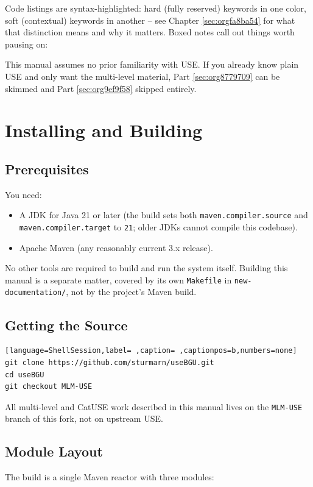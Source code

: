 \documentclass[11pt,twoside,a4paper]{book}
\begin{document}
Code listings are syntax-highlighted: hard (fully reserved) keywords
in one color, soft (contextual) keywords in another -- see Chapter
\ref{sec:orgfa8ba54} for what that distinction means and why it
matters. Boxed notes call out things worth pausing on:

\begin{manualnote}
This manual assumes no prior familiarity with USE. If you already know
plain USE and only want the multi-level material, Part
\ref{sec:org8779709} can be skimmed and Part \ref{sec:org9ef9f58}
skipped entirely.
\end{manualnote}
\chapter{Installing and Building}
\label{sec:org73dfb48}
\section{Prerequisites}
\label{sec:orgdc154d7}

You need:

\begin{itemize}
\item A JDK for Java 21 or later (the build sets both
\texttt{maven.compiler.source} and \texttt{maven.compiler.target} to \texttt{21}; older
JDKs cannot compile this codebase).
\item Apache Maven (any reasonably current 3.x release).
\end{itemize}

No other tools are required to build and run the system itself.
Building this manual is a separate matter, covered by its own
\texttt{Makefile} in \texttt{new-documentation/}, not by the project's Maven build.

\section{Getting the Source}
\label{sec:org0fb9f19}
\begin{lstlisting}[language=ShellSession,label= ,caption= ,captionpos=b,numbers=none]
git clone https://github.com/sturmarn/useBGU.git
cd useBGU
git checkout MLM-USE
\end{lstlisting}

All multi-level and CatUSE work described in this manual lives on the
\texttt{MLM-USE} branch of this fork, not on upstream USE.

\section{Module Layout}
\label{sec:org1de4a7e}
The build is a single Maven reactor with three modules:
\end{document}
